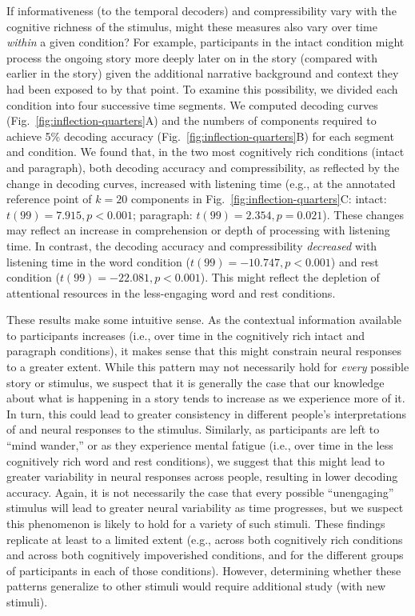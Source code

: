\documentclass[english, 11pt]{article}
\begin{document}
If informativeness (to the temporal decoders) and compressibility vary with the
cognitive richness of the stimulus, might these measures also vary over time
\textit{within} a given condition? For example, participants in the intact
condition might process the ongoing story more deeply later on in the story
(compared with earlier in the story) given the additional narrative background
and context they had been exposed to by that point. To examine this
possibility, we divided each condition into four successive time segments. We
computed decoding curves (Fig.~\ref{fig:inflection-quarters}A) and the numbers
of components required to achieve 5\% decoding accuracy
(Fig.~\ref{fig:inflection-quarters}B) for each segment and condition. We found
that, in the two most cognitively rich conditions (intact and paragraph), both
decoding accuracy and compressibility, as reflected by the change in decoding
curves, increased with listening time (e.g., at the annotated reference point
of $k = 20$ components in Fig.~\ref{fig:inflection-quarters}C: intact: $t(99) =
7.915, p < 0.001$; paragraph: $t(99) = 2.354, p = 0.021$). These changes may
reflect an increase in comprehension or depth of processing with listening
time. In contrast, the decoding accuracy and compressibility \textit{decreased}
with listening time in the word condition ($t(99) = -10.747, p < 0.001$) and
rest condition ($t(99) = -22.081, p < 0.001$). This might reflect the
depletion of attentional resources in the less-engaging word and rest
conditions.

These results make some intuitive sense. As the contextual information
available to participants increases (i.e., over time in the cognitively rich
intact and paragraph conditions), it makes sense that this might
constrain neural responses to a greater extent. While this pattern may not
necessarily hold for \textit{every} possible story or stimulus, we suspect that
it is generally the case that our knowledge about what is happening in a story
tends to increase as we experience more of it. In turn, this could lead to
greater consistency in different people's interpretations of and neural
responses to the stimulus. Similarly, as participants are left to ``mind
wander,'' or as they experience mental fatigue (i.e., over time in the less
cognitively rich word and rest conditions), we suggest that this might
lead to greater variability in neural responses across people, resulting in
lower decoding accuracy. Again, it is not necessarily the case that every
possible ``unengaging'' stimulus will lead to greater neural variability as
time progresses, but we suspect this phenomenon is likely to hold for a variety
of such stimuli. These findings replicate at least to a limited extent (e.g.,
across both cognitively rich conditions and across both cognitively
impoverished conditions, and for the different groups of participants in each
of those conditions). However, determining whether these patterns generalize to
other stimuli would require additional study (with new stimuli).
\end{document}
